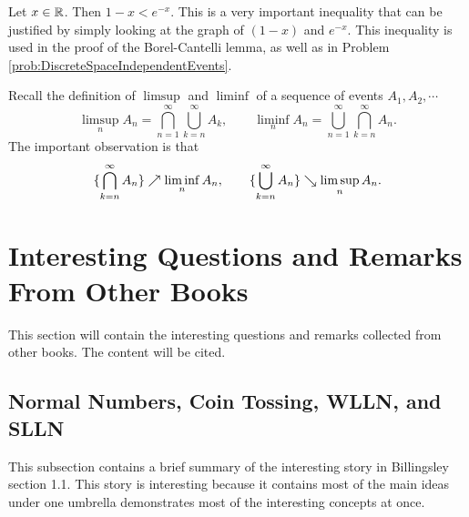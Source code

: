 \begin{observation}
	Let $ x\in \mathbb{R} $. Then $ 1-x < e^{-x} $. This is a very important inequality that can be justified by simply looking at the graph of $ (1-x) $ and $ e^{-x} $. This inequality is used in the proof of the Borel-Cantelli lemma, as well as in Problem \autoref{prob:DiscreteSpaceIndependentEvents}.
\end{observation}


\begin{observation}[]
	Recall the definition of $ \limsup $ and $ \liminf $ of a sequence of events $ A_1,A_2,\cdots $
	\[ \limsup_n A_n = \bigcap_{n=1}^{\infty} \bigcup_{k=n}^{\infty} A_k, \qquad \liminf_n A_n = \bigcup_{n=1}^{\infty}\bigcap_{k=n}^\infty A_n. \]
	The important observation is that
	\[ \{\bigcap_{k=n}^{\infty}A_n\}  \nearrow \liminf_n A_n, \qquad \{\bigcup_{k=n}^\infty A_n\} \searrow \limsup_n A_n. \]
\end{observation}



\newpage
\section{Interesting Questions and Remarks From Other Books}
This section will contain the interesting questions and remarks collected from other books. The content will be cited.


\subsection{Normal Numbers, Coin Tossing, WLLN, and SLLN}
This subsection contains a brief summary of the interesting story in Billingsley section 1.1. This story is interesting because it contains most of the main ideas under one umbrella demonstrates most of the interesting concepts at once.


